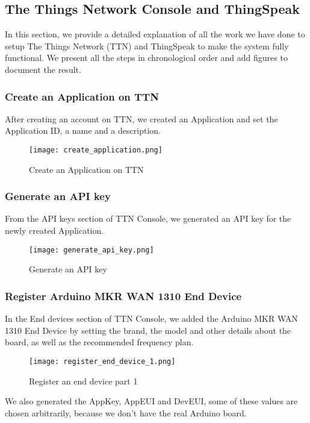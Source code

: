 \subsection{The Things Network Console and ThingSpeak}
In this section, we provide a detailed explanation of all the work we have done to setup The Things Network (TTN) and ThingSpeak to make the system fully functional. We present all the steps in chronological order and add figures to document the result.
\subsubsection{Create an Application on TTN}
After creating an account on TTN, we created an Application and set the Application ID, a name and a description.

\begin{figure}[H]
    \centering
    \texttt{[image: create\_application.png]}
    \caption{Create an Application on TTN}
\end{figure}

\subsubsection{Generate an API key}
From the API keys section of TTN Console, we generated an API key for the newly created Application.

\begin{figure}[H]
    \centering
    \texttt{[image: generate\_api\_key.png]}
    \caption{Generate an API key}
\end{figure}

\subsubsection{Register Arduino MKR WAN 1310 End Device}
In the End devices section of TTN Console, we added the Arduino MKR WAN 1310 End Device by setting the brand, the model and other details about the board, as well as the recommended frequency plan. 

\begin{figure}[H]
    \centering
    \texttt{[image: register\_end\_device\_1.png]}
    \caption{Register an end device part 1}
\end{figure}

We also generated the AppKey, AppEUI and DevEUI, some of these values are chosen arbitrarily, because we don't have the real Arduino board.

